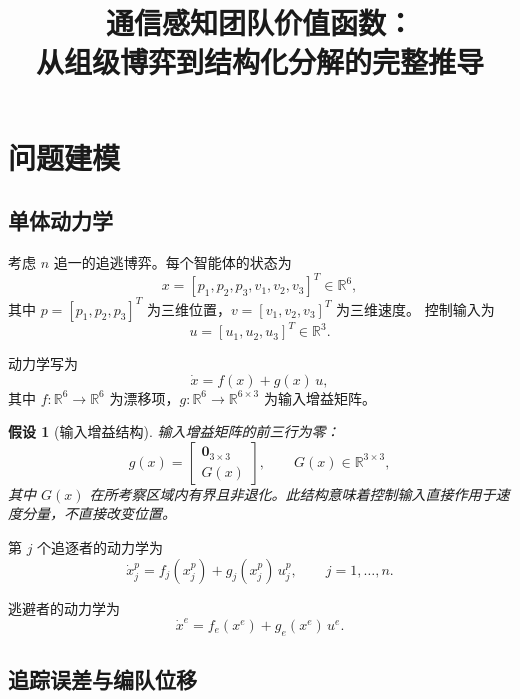 \documentclass[12pt,a4paper]{ctexart}
\title{通信感知团队价值函数：\\
从组级博弈到结构化分解的完整推导}
\author{}
\date{}
\newtheorem{assumption}[theorem]{假设}
\begin{document}
\maketitle
\tableofcontents
\newpage

\section{问题建模}

\subsection{单体动力学}

考虑 $n$ 追一的追逃博弈。每个智能体的状态为
\[
x = [p_1, p_2, p_3, v_1, v_2, v_3]^T \in \mathbb{R}^6,
\]
其中 $p = [p_1, p_2, p_3]^T$ 为三维位置，$v = [v_1, v_2, v_3]^T$ 为三维速度。
控制输入为
\[
u = [u_1, u_2, u_3]^T \in \mathbb{R}^3.
\]

动力学写为
\begin{equation}\label{eq:dynamics}
\dot{x} = f(x) + g(x)\,u,
\end{equation}
其中 $f\colon \mathbb{R}^6 \to \mathbb{R}^6$ 为漂移项，$g\colon \mathbb{R}^6 \to \mathbb{R}^{6 \times 3}$ 为输入增益矩阵。

\begin{assumption}[输入增益结构]\label{ass:g-structure}
输入增益矩阵的前三行为零：
\[
g(x) = \begin{bmatrix} \bm{0}_{3\times 3} \\ G(x) \end{bmatrix},
\qquad G(x) \in \mathbb{R}^{3\times 3},
\]
其中 $G(x)$ 在所考察区域内有界且非退化。此结构意味着控制输入直接作用于速度分量，不直接改变位置。
\end{assumption}

第 $j$ 个追逐者的动力学为
\begin{equation}
\dot{x}_j^p = f_j(x_j^p) + g_j(x_j^p)\,u_j^p, \qquad j = 1, \dots, n.
\end{equation}

逃避者的动力学为
\begin{equation}
\dot{x}^e = f_e(x^e) + g_e(x^e)\,u^e.
\end{equation}

\subsection{追踪误差与编队位移}
\end{document}
